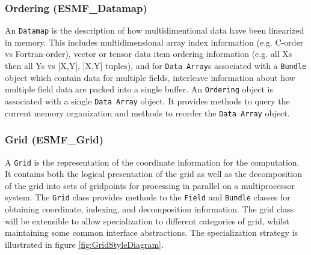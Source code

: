 \subsubsection{Ordering (ESMF\_Datamap)}
\label{sec:ordering} 
An {\tt Datamap} is the description of how multidimentional data have been
linearized in memory.  This includes multidimensional array index information (e.g. C-order
vs Fortran-order), vector or tensor data item ordering information (e.g. all Xs then all
Ys vs [X,Y], [X,Y] tuples), and for {\tt Data Array}s associated with a {\tt Bundle} object which contain
data for multiple fields, interleave information about how multiple field data are 
packed into a single buffer.
An {\tt Ordering} object is associated with a single {\tt Data Array} object.  It provides
methods to query the current memory organization and methods to reorder the 
{\tt Data Array} object.

\subsubsection{Grid (ESMF\_Grid)}
\label{sec:grid} 
A {\tt Grid} is the representation of the coordinate information for
the computation.  It contains both the logical presentation of the grid 
as well as the
decomposition of the grid into sets of gridpoints for processing in parallel on a
multiprocessor system.  The {\tt Grid} class provides methods to the
{\tt Field} and {\tt Bundle} classes for obtaining coordinate, indexing, and 
decomposition information. The grid class will be extensible 
to allow specialization to different categories of grid, whilst maintaining
some common interface abstractions. The specialization strategy is illustrated
in figure \ref{fig:GridStyleDiagram}.

